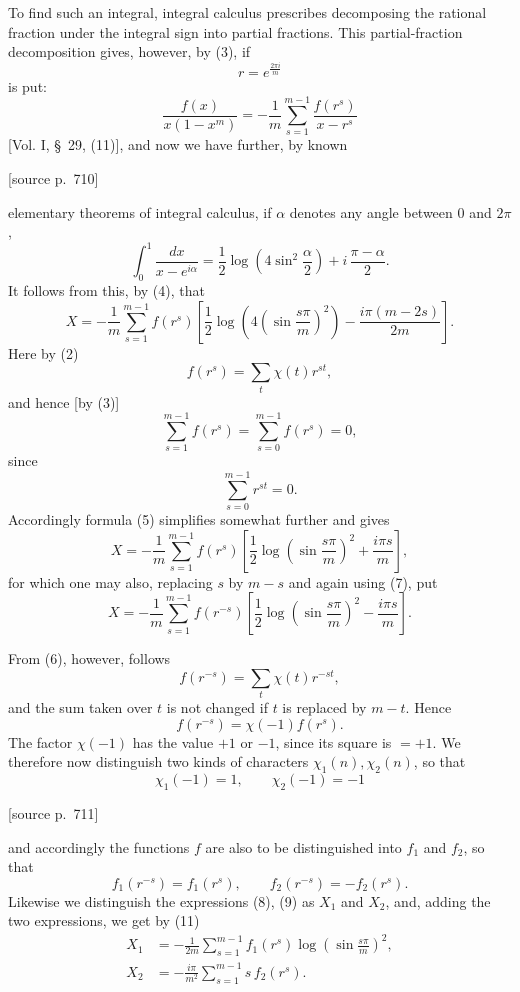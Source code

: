 \documentclass[11pt]{article}
\newcommand{\srcpage}[1]{\par\medskip\noindent\textsf{[source p.~#1]}\par\smallskip}
\begin{document}
To find such an integral, integral calculus prescribes decomposing the rational fraction under the integral sign into partial fractions. This partial-fraction decomposition gives, however, by (3), if
\[
r=e^{\frac{2\pi i}{m}}
\]
is put:
\[
\frac{f(x)}{x(1-x^m)}
=-\frac1m\sum_{s=1}^{m-1}\frac{f(r^s)}{x-r^s}
\]
[Vol. I, \S~29, (11)], and now we have further, by known

\srcpage{710}
elementary theorems of integral calculus, if $\alpha$ denotes any angle between $0$ and $2\pi$,
\[
\int_0^1\frac{dx}{x-e^{i\alpha}}
=\frac12\log\left(4\sin^2\frac{\alpha}{2}\right)
+i\,\frac{\pi-\alpha}{2}.
\]
It follows from this, by (4), that
\begin{equation}
X=-\frac1m\sum_{s=1}^{m-1}f(r^s)
\left[\frac12\log\left(4\left(\sin\frac{s\pi}{m}\right)^2\right)-\frac{i\pi(m-2s)}{2m}\right].
\tag{5}
\end{equation}
Here by (2)
\begin{equation}
f(r^s)=\sum_t\chi(t)r^{st},
\tag{6}
\end{equation}
and hence [by (3)]
\begin{equation}
\sum_{s=1}^{m-1}f(r^s)=\sum_{s=0}^{m-1}f(r^s)=0,
\tag{7}
\end{equation}
since
\[
\sum_{s=0}^{m-1}r^{st}=0.
\]
Accordingly formula (5) simplifies somewhat further and gives
\begin{equation}
X=-\frac1m\sum_{s=1}^{m-1}f(r^s)
\left[\frac12\log\left(\sin\frac{s\pi}{m}\right)^2+\frac{i\pi s}{m}\right],
\tag{8}
\end{equation}
for which one may also, replacing $s$ by $m-s$ and again using (7), put
\begin{equation}
X=-\frac1m\sum_{s=1}^{m-1}f(r^{-s})
\left[\frac12\log\left(\sin\frac{s\pi}{m}\right)^2-\frac{i\pi s}{m}\right].
\tag{9}
\end{equation}

From (6), however, follows
\[
f(r^{-s})=\sum_t\chi(t)r^{-st},
\]
and the sum taken over $t$ is not changed if $t$ is replaced by $m-t$. Hence
\[
f(r^{-s})=\chi(-1)f(r^s).
\]
The factor $\chi(-1)$ has the value $+1$ or $-1$, since its square is $=+1$. We therefore now distinguish two kinds of characters $\chi_1(n),\chi_2(n)$, so that
\begin{equation}
\chi_1(-1)=1,\qquad \chi_2(-1)=-1
\tag{10}
\end{equation}

\srcpage{711}
and accordingly the functions $f$ are also to be distinguished into $f_1$ and $f_2$, so that
\begin{equation}
f_1(r^{-s})=f_1(r^s),\qquad f_2(r^{-s})=-f_2(r^s).
\tag{11}
\end{equation}
Likewise we distinguish the expressions (8), (9) as $X_1$ and $X_2$, and, adding the two expressions, we get by (11)
\begin{equation}
\begin{aligned}
X_1&=-\frac1{2m}\sum_{s=1}^{m-1}f_1(r^s)\log\left(\sin\frac{s\pi}{m}\right)^2,\\
X_2&=-\frac{i\pi}{m^2}\sum_{s=1}^{m-1}s\,f_2(r^s).
\end{aligned}
\tag{12}
\end{equation}
\end{document}
